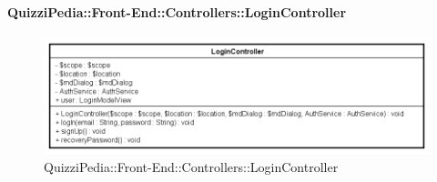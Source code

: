 \paragraph{QuizziPedia::Front-End::Controllers::LoginController}
\begin{figure} [ht]
	\centering
	\includegraphics[scale=0.80]{UML/Classi/Front-End/QuizziPedia_Front-end_Controller_LoginController.png}
	\caption{QuizziPedia::Front-End::Controllers::LoginController}
\end{figure} \FloatBarrier
